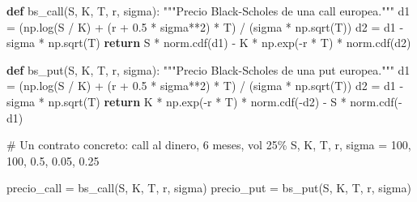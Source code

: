 \documentclass[
  spanish,
  letterpaper,
  DIV=11,
  numbers=noendperiod]{scrreprt}
\newenvironment{Shaded}{\begin{snugshade}}{\end{snugshade}}
\newcommand{\CommentTok}[1]{\textcolor[rgb]{0.37,0.37,0.37}{#1}}
\newcommand{\ControlFlowTok}[1]{\textcolor[rgb]{0.00,0.23,0.31}{\textbf{#1}}}
\newcommand{\DecValTok}[1]{\textcolor[rgb]{0.68,0.00,0.00}{#1}}
\newcommand{\FloatTok}[1]{\textcolor[rgb]{0.68,0.00,0.00}{#1}}
\newcommand{\KeywordTok}[1]{\textcolor[rgb]{0.00,0.23,0.31}{\textbf{#1}}}
\newcommand{\NormalTok}[1]{\textcolor[rgb]{0.00,0.23,0.31}{#1}}
\newcommand{\OperatorTok}[1]{\textcolor[rgb]{0.37,0.37,0.37}{#1}}
\begin{document}
\label{bsm}
\begin{Shaded}
\begin{Highlighting}[]
\KeywordTok{def}\NormalTok{ bs\_call(S, K, T, r, sigma):}
    \CommentTok{"""Precio Black{-}Scholes de una call europea."""}
\NormalTok{    d1 }\OperatorTok{=}\NormalTok{ (np.log(S }\OperatorTok{/}\NormalTok{ K) }\OperatorTok{+}\NormalTok{ (r }\OperatorTok{+} \FloatTok{0.5} \OperatorTok{*}\NormalTok{ sigma}\OperatorTok{**}\DecValTok{2}\NormalTok{) }\OperatorTok{*}\NormalTok{ T) }\OperatorTok{/}\NormalTok{ (sigma }\OperatorTok{*}\NormalTok{ np.sqrt(T))}
\NormalTok{    d2 }\OperatorTok{=}\NormalTok{ d1 }\OperatorTok{{-}}\NormalTok{ sigma }\OperatorTok{*}\NormalTok{ np.sqrt(T)}
    \ControlFlowTok{return}\NormalTok{ S }\OperatorTok{*}\NormalTok{ norm.cdf(d1) }\OperatorTok{{-}}\NormalTok{ K }\OperatorTok{*}\NormalTok{ np.exp(}\OperatorTok{{-}}\NormalTok{r }\OperatorTok{*}\NormalTok{ T) }\OperatorTok{*}\NormalTok{ norm.cdf(d2)}

\KeywordTok{def}\NormalTok{ bs\_put(S, K, T, r, sigma):}
    \CommentTok{"""Precio Black{-}Scholes de una put europea."""}
\NormalTok{    d1 }\OperatorTok{=}\NormalTok{ (np.log(S }\OperatorTok{/}\NormalTok{ K) }\OperatorTok{+}\NormalTok{ (r }\OperatorTok{+} \FloatTok{0.5} \OperatorTok{*}\NormalTok{ sigma}\OperatorTok{**}\DecValTok{2}\NormalTok{) }\OperatorTok{*}\NormalTok{ T) }\OperatorTok{/}\NormalTok{ (sigma }\OperatorTok{*}\NormalTok{ np.sqrt(T))}
\NormalTok{    d2 }\OperatorTok{=}\NormalTok{ d1 }\OperatorTok{{-}}\NormalTok{ sigma }\OperatorTok{*}\NormalTok{ np.sqrt(T)}
    \ControlFlowTok{return}\NormalTok{ K }\OperatorTok{*}\NormalTok{ np.exp(}\OperatorTok{{-}}\NormalTok{r }\OperatorTok{*}\NormalTok{ T) }\OperatorTok{*}\NormalTok{ norm.cdf(}\OperatorTok{{-}}\NormalTok{d2) }\OperatorTok{{-}}\NormalTok{ S }\OperatorTok{*}\NormalTok{ norm.cdf(}\OperatorTok{{-}}\NormalTok{d1)}

\CommentTok{\# Un contrato concreto: call al dinero, 6 meses, vol 25\%}
\NormalTok{S, K, T, r, sigma }\OperatorTok{=} \DecValTok{100}\NormalTok{, }\DecValTok{100}\NormalTok{, }\FloatTok{0.5}\NormalTok{, }\FloatTok{0.05}\NormalTok{, }\FloatTok{0.25}

\NormalTok{precio\_call }\OperatorTok{=}\NormalTok{ bs\_call(S, K, T, r, sigma)}
\NormalTok{precio\_put }\OperatorTok{=}\NormalTok{ bs\_put(S, K, T, r, sigma)}


\end{Highlighting}
\end{Shaded}
\end{document}
